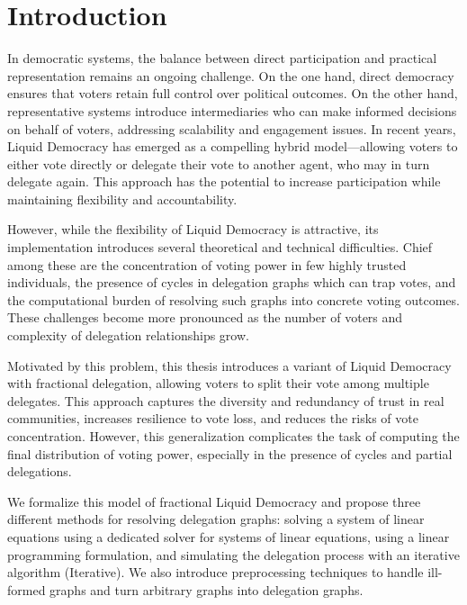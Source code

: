 
\chapter{Introduction}



In democratic systems, the balance between direct participation and practical representation remains an ongoing challenge. On the one hand, direct democracy ensures that voters retain full control over political outcomes. On the other hand, representative systems introduce intermediaries who can make informed decisions on behalf of voters, addressing scalability and engagement issues. In recent years, Liquid Democracy has emerged as a compelling hybrid model—allowing voters to either vote directly or delegate their vote to another agent, who may in turn delegate again. This approach has the potential to increase participation while maintaining flexibility and accountability.

However, while the flexibility of Liquid Democracy is attractive, its implementation introduces several theoretical and technical difficulties. Chief among these are the concentration of voting power in few highly trusted individuals, the presence of cycles in delegation graphs which can trap votes, and the computational burden of resolving such graphs into concrete voting outcomes. These challenges become more pronounced as the number of voters and complexity of delegation relationships grow.

Motivated by this problem, this thesis introduces a variant of Liquid Democracy with fractional delegation, allowing voters to split their vote among multiple delegates. This approach captures the diversity and redundancy of trust in real communities, increases resilience to vote loss, and reduces the risks of vote concentration. However, this generalization complicates the task of computing the final distribution of voting power, especially in the presence of cycles and partial delegations.

We formalize this model of fractional Liquid Democracy and propose three different methods for resolving delegation graphs: solving a system of linear equations using a dedicated solver for systems of linear equations, using a linear programming formulation, and simulating the delegation process with an iterative algorithm (Iterative). We also introduce preprocessing techniques to handle ill-formed graphs and turn arbitrary graphs into delegation graphs.

